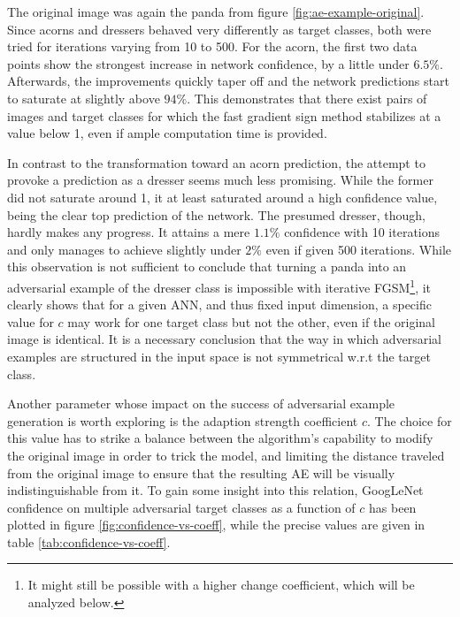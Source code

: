 \documentclass[11pt, a4paper]{article}
\begin{document}
The original image was again the panda from figure \ref{fig:ae-example-original}. Since acorns and dressers behaved very differently as target classes, both were tried for iterations varying from 10 to 500. For the acorn, the first two data points show the strongest increase in network confidence, by a little under $6.5\%$. Afterwards, the improvements quickly taper off and the network predictions start to saturate at slightly above $94\%$. This demonstrates that there exist pairs of images and target classes for which the fast gradient sign method stabilizes at a value below 1, even if ample computation time is provided.

In contrast to the transformation toward an acorn prediction, the attempt to provoke a prediction as a dresser seems much less promising. While the former did not saturate around 1, it at least saturated around a high confidence value, being the clear top prediction of the network. The presumed dresser, though, hardly makes any progress. It attains a mere $1.1\%$ confidence with 10 iterations and only manages to achieve slightly under $2\%$ even if given 500 iterations. While this observation is not sufficient to conclude that turning a panda into an adversarial example of the dresser class is impossible with iterative FGSM\footnote{It might still be possible with a higher change coefficient, which will be analyzed below.}, it clearly shows that for a given ANN, and thus fixed input dimension, a specific value for $c$ may work for one target class but not the other, even if the original image is identical. It is a necessary conclusion that the way in which adversarial examples are structured in the input space is not symmetrical w.r.t the target class.

Another parameter whose impact on the success of adversarial example generation is worth exploring is the adaption strength coefficient $c$. The choice for this value has to strike a balance between the algorithm's capability to modify the original image in order to trick the model, and limiting the distance traveled from the original image to ensure that the resulting AE will be visually indistinguishable from it. To gain some insight into this relation, GoogLeNet confidence on multiple adversarial target classes as a function of $c$ has been plotted in figure \ref{fig:confidence-vs-coeff}, while the precise values are given in table \ref{tab:confidence-vs-coeff}.
\end{document}
